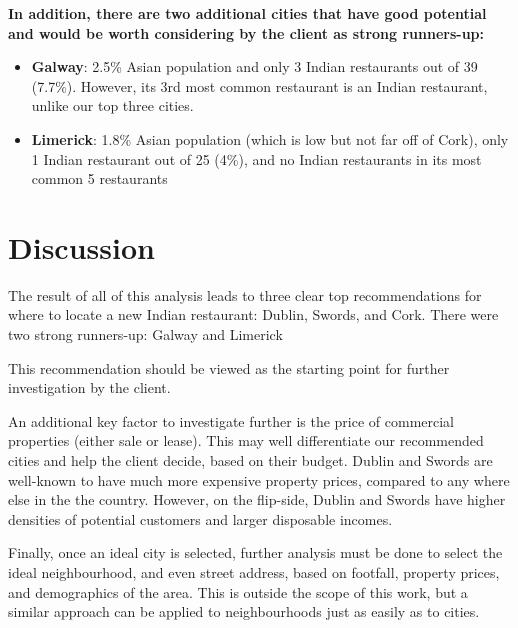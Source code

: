 \documentclass[a4paper,11pt]{article}
\begin{document}
\textbf{In addition, there are two additional cities that have good potential and would be worth considering by the client as strong runners-up:}  

\begin{itemize}
	\item \textbf{Galway}: 2.5\% Asian population and only 3 Indian restaurants out of 39 (7.7\%). However, its 3rd most common restaurant is an Indian restaurant, unlike our top three cities.
	\item \textbf{Limerick}: 1.8\% Asian population (which is low but not far off of Cork), only 1 Indian restaurant out of 25 (4\%), and no Indian restaurants in its most common 5 restaurants
\end{itemize}

\section{Discussion}\label{sec: discussion}



The result of all of this analysis leads to three clear top recommendations for where to locate a new Indian restaurant: Dublin, Swords, and Cork. There were two strong runners-up: Galway and Limerick

This recommendation should be viewed as the starting point for further investigation by the client.

An additional key factor to investigate further is the price of commercial properties (either sale or lease). This may well differentiate our recommended cities and help the client decide, based on their budget. Dublin and Swords are well-known to have much more expensive property prices, compared to any where else in the the country. However, on the flip-side, Dublin and Swords have higher densities of potential customers and larger disposable incomes.

Finally, once an ideal city is selected, further analysis must be done to select the ideal neighbourhood, and even street address, based on footfall, property prices, and demographics of the area. This is outside the scope of this work, but a similar approach can be applied to neighbourhoods just as easily as to cities.
\end{document}
